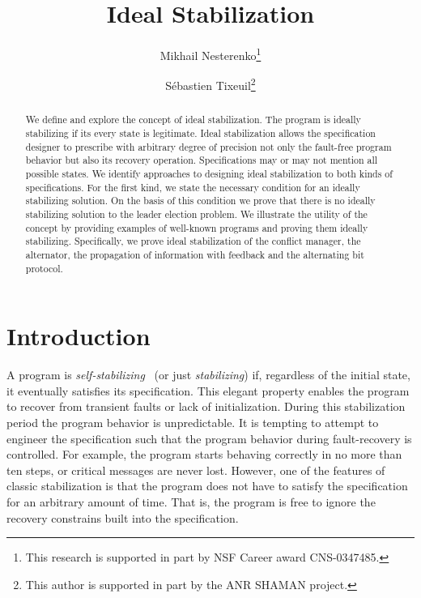 \documentclass[11pt]{llncs}
\begin{document}
\title{Ideal Stabilization}

\author{Mikhail Nesterenko\thanks{This
research is supported in part by NSF Career award CNS-0347485.}
\and S\'ebastien Tixeuil\thanks{This author is supported in part by the ANR SHAMAN project.}}
\maketitle
\begin{abstract}
We define and explore the concept of ideal stabilization.  The program
is ideally stabilizing if its every state is legitimate. Ideal
stabilization allows the specification designer to prescribe with
arbitrary degree of precision not only the fault-free program behavior
but also its recovery operation. Specifications may or may not mention
all possible states. We identify approaches to designing ideal
stabilization to both kinds of specifications. For the first kind, we
state the necessary condition for an ideally stabilizing solution. On
the basis of this condition we prove that there is no ideally
stabilizing solution to the leader election problem. We illustrate the
utility of the concept by providing examples of well-known programs
and proving them ideally stabilizing.  Specifically, we prove ideal
stabilization of the conflict manager, the alternator, the propagation
of information with feedback and the alternating bit protocol.
\end{abstract}

\section{Introduction}\label{SecIntro}

A program is \emph{self-stabilizing}~\cite{D74j,D00b,T09bc} (or just
\emph{stabilizing}) if, regardless of the initial state, it eventually
satisfies its specification. This elegant property enables the program
to recover from transient faults or lack of initialization. During
this stabilization period the program behavior is unpredictable. It is
tempting to attempt to engineer the specification such that the
program behavior during fault-recovery is controlled. For example, the
program starts behaving correctly in no more than ten steps, or
critical messages are never lost. However, one of the features of
classic stabilization is that the program does not have to satisfy the
specification for an arbitrary amount of time. That is, the program is
free to ignore the recovery constrains built into the
specification. 
\end{document}
